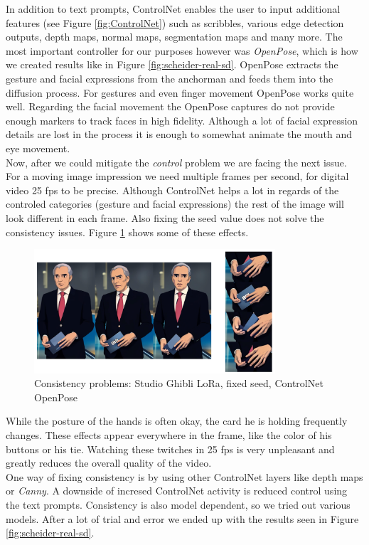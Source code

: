 \documentclass[
  a4paper,  %
  twoside,  %
  bibliography=totoc,
  headsepline,
  cleardoublepage=empty,
  parskip=half,
  draft=false
]{scrbook}
\begin{document}
In addition to text prompts, ControlNet enables the user to input additional features (see Figure \ref{fig:ControlNet}) such as scribbles, various edge detection outputs, depth maps, normal maps, segmentation maps and many more. The most important controller for our purposes however was \textit{OpenPose}, which is how we created results like in Figure \ref{fig:scheider-real-sd}. OpenPose extracts the gesture and facial expressions from the anchorman and feeds them into the diffusion process. For gestures and even finger movement OpenPose works quite well. Regarding the facial movement the OpenPose captures do not provide enough markers to track faces in high fidelity. Although a lot of facial expression details are lost in the process it is enough to somewhat animate the mouth and eye movement. \\
Now, after we could mitigate the \textit{control} problem we are facing the next issue. For a moving image impression we need multiple frames per second, for digital video 25 \gls{fps} to be precise. Although ControlNet helps a lot in regards of the controled categories (gesture and facial expressions) the rest of the image will look different in each frame. Also fixing the seed value does not solve the consistency issues. Figure \ref{fig:controlnet-issues} shows some of these effects.
\begin{figure}[h]
  \centering
  \includegraphics[width=0.8\textwidth]{./graphics/images/diffusion/ControlNet-issues.png}
  \caption{Consistency problems: Studio Ghibli LoRa, fixed seed, ControlNet OpenPose}
  \label{fig:controlnet-issues}
\end{figure}
While the posture of the hands is often okay, the card he is holding frequently changes. These effects appear everywhere in the frame, like the color of his buttons or his tie. Watching these twitches in 25 \gls{fps} is very unpleasant and greatly reduces the overall quality of the video. \\
One way of fixing consistency is by using other ControlNet layers like depth maps or \textit{Canny}. A downside of incresed ControlNet activity is reduced control using the text prompts. Consistency is also model dependent, so we tried out various models. After a lot of trial and error we ended up with the results seen in Figure \ref{fig:scheider-real-sd}.
\end{document}
